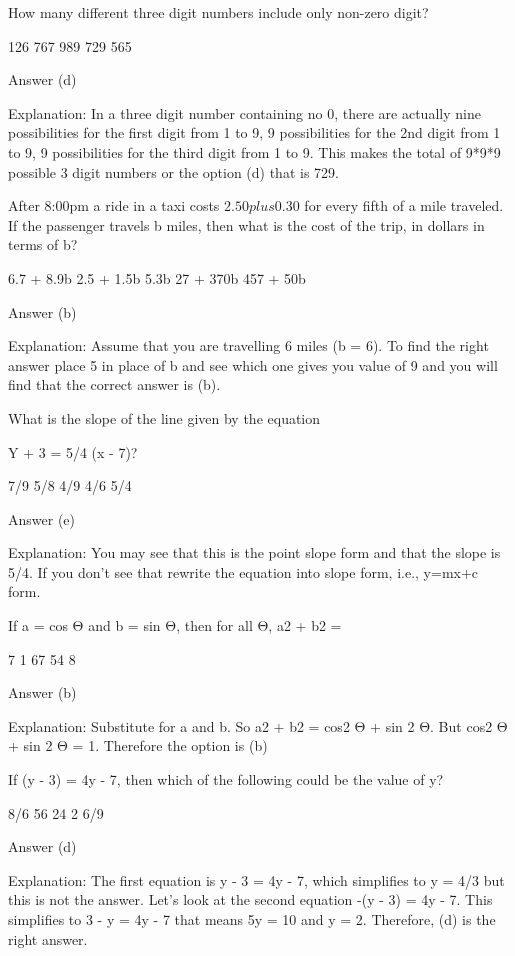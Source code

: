     How many different three digit numbers include only non-zero digit?

        126
        767
        989
        729
        565 

    Answer (d)

    Explanation: In a three digit number containing no 0, there are actually nine possibilities for the first digit from 1 to 9, 9 possibilities for the 2nd digit from 1 to 9, 9 possibilities for the third digit from 1 to 9. This makes the total of 9*9*9 possible 3 digit numbers or the option (d) that is 729.

    After 8:00pm a ride in a taxi costs $2.50 plus $0.30 for every fifth of a mile traveled. If the passenger travels b miles, then what is the cost of the trip, in dollars in terms of b?

        6.7 + 8.9b
        2.5 + 1.5b
        5.3b
        27 + 370b
        457 + 50b 

    Answer (b)

    Explanation: Assume that you are travelling 6 miles (b = 6). To find the right answer place 5 in place of b and see which one gives you value of 9 and you will find that the correct answer is (b).

    What is the slope of the line given by the equation

    Y + 3 = 5/4 (x - 7)?

        7/9
        5/8
        4/9
        4/6
        5/4 

    Answer (e)

    Explanation: You may see that this is the point slope form and that the slope is 5/4. If you don't see that rewrite the equation into slope form, i.e., y=mx+c form.

    If a = cos Θ and b = sin Θ, then for all Θ, a2 + b2 =

        7
        1
        67
        54
        8 

    Answer (b)

    Explanation: Substitute for a and b. So a2 + b2 = cos2 Θ + sin 2 Θ. But cos2 Θ + sin 2 Θ = 1. Therefore the option is (b)

    If (y - 3) = 4y - 7, then which of the following could be the value of y?

        8/6
        56
        24
        2
        6/9 

    Answer (d)

    Explanation: The first equation is y - 3 = 4y - 7, which simplifies to y = 4/3 but this is not the answer. Let's look at the second equation -(y - 3) = 4y - 7. This simplifies to 3 - y = 4y - 7 that means 5y = 10 and y = 2. Therefore, (d) is the right answer.

